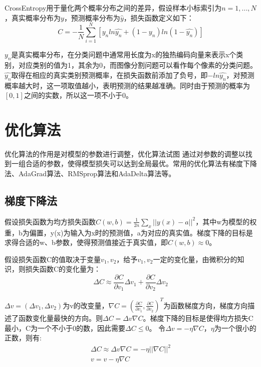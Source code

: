 \documentclass[AutoFakeBold]{LZUThesis}
\begin{document}
CrossEntropy用于量化两个概率分布之间的差异，假设样本小标索引为$n=1,...,N$，真实概率分布为$y$，预测概率分布为$\hat{y}$，损失函数定义如下：
\begin{equation}
    C=-\frac{1}{N}\sum_{i=1}^{N}[y_n ln \hat{y_n}+(1-y_n)ln(1-\hat{y_n})]
\end{equation}
\par
$y_n$是真实概率分布，在分类问题中通常用长度为x的独热编码向量来表示x个类别，对应类别的值为1，其余为0，而图像分割问题可以看作每个像素的分类问题。$\hat{y_n}$取得在相应的真实类别预测概率，在损失函数前添加了负号，即$-ln \hat{y_n}$，对预测概率越大时，这一项取值越小，表明预测的结果越准确。同时由于预测的概率为$[0,1]$之间的实数，所以这一项不小于0。








\section{优化算法}
优化算法的作用是对模型的参数进行调整，优化算法试图
通过对参数的调整以找到一组合适的参数，使得模型损失可以达到全局最优。常用的优化算法有梯度下降法、AdaGrad算法、RMSprop算法和AdaDelta算法等\textsuperscript{\cite{zhang2021dive, ruder2016overview,nielsen2015neural}}。

\subsection{梯度下降法}
假设损失函数为均方损失函数$C(w,b)=\frac{1}{2n}\sum_x||y(x)-a||^2$，其中w为模型的权重，b为偏置，y(x)为输入为x时的预测值，a为对应的真实值。梯度下降的目标是求得合适的w、b参数，使得预测值接近于真实值，即$C(w,b)\approx 0$。

假设损失函数C的值取决于变量$v_1, v_2$，给予$v_1, v_2$一定的变化量，由微积分的知识，则损失函数C的变化量为：
\begin{equation}
    \Delta C \approx \frac{\partial C}{\partial v_1}\Delta v_1 + \frac{\partial C}{\partial v_2}\Delta v_2
\end{equation}

$\Delta v=(\Delta v_1,\Delta v_2)$为v的改变量，$\nabla C=(\frac{\partial C}{\partial v_1} , \frac{\partial C}{\partial v_2})^T$为函数梯度方向，梯度方向描述了函数变化量最快的方向。则$\Delta C=\Delta v \nabla C$。梯度下降的目标是使得均方损失C最小，C为一个不小于0的数，因此需要$\Delta C \leq 0$。
令$\Delta v=- \eta \nabla C$，$\eta$为一个很小的正数，则有:
\begin{equation}
    \begin{aligned}
        \Delta C \approx \Delta v \nabla C=-\eta ||\nabla C||^2 \\
        v=v-\eta \nabla C
    \end{aligned}
\end{equation}
\end{document}
